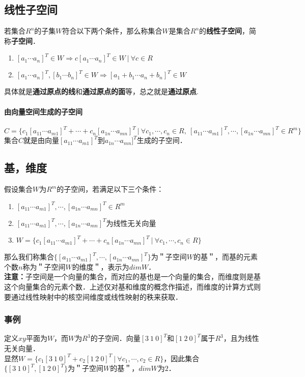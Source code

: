 \documentclass[12pt]{article}
\begin{document}
\begin{CJK}{UTF8}{gbsn}
\section{线性子空间}
若集合$R^n$的子集$W$符合以下两个条件，那么称集合$W$是集合$R^n$的\textbf{线性子空间}，简称\textbf{子空间}．
\begin{enumerate}
\item $[a_1\cdots a_n]^T\in W \Rightarrow c[a_1\cdots a_n]^T\in W\ |\ \forall c \in R$
\item $[a_1\cdots a_n]^T, [b_1\cdots b_n]^T\in W \Rightarrow [a_1+b_1\cdots a_n+b_n]^T\in W$
\end{enumerate}
具体就是\textbf{通过原点的线}和\textbf{通过原点的面}等，总之就是\textbf{通过原点}.
\paragraph{由向量空间生成的子空间}
\begin{equation}
C=\lbrace c_1[a_{11}\cdots a_{m1}]^T + \cdots + c_n[a_{1n}\cdots a_{mn}]^T\ |\ \forall c_1,\cdots,c_n \in R,\ [a_{11}\cdots a_{m1}]^T,\cdots,[a_{1n}\cdots a_{mn}]^T \in R^m\rbrace
\end{equation}
集合$C$就是由向量$[a_{11}\cdots a_{m1}]^T$到$a_{1n}\cdots a_{mn}]^T$生成的子空间．
\subsection{基，维度}
假设集合$W$为$R^m$的子空间，若满足以下三个条件：
\begin{enumerate}
\item $[a_{11} \cdots a_{m1}]^T, \cdots, [a_{1n} \cdots a_{mn}]^T \in R^m$
\item $[a_{11} \cdots a_{m1}]^T, \cdots, [a_{1n} \cdots a_{mn}]^T$为线性无关向量
\item $W=\lbrace c_1[a_{11} \cdots a_{m1}]^T + \cdots + c_n[a_{1n} \cdots a_{mn}]^T\ |\ \forall c_1,\cdots,c_n\in R \rbrace$
\end{enumerate}
那么我们称集合$\lbrace [a_{11} \cdots a_{m1}]^T, \cdots ,[a_{1n} \cdots a_{mn}]^T \rbrace$为＂子空间$W$的基＂，而基的元素个数$n$称为＂子空间$W$的维度＂，表示为$dimW$．\\
\textbf{注意：}子空间是一个向量的集合，而对应的基也是一个向量的集合，而维度则是基这个向量集合的元素个数．上述仅对基和维度的概念作描述，而维度的计算方式则要通过线性映射中的核空间维度或线性映射的秩来获取．
\subsubsection{事例}
定义$xy$平面为$W$，而$W$为$R^3$的子空间．向量$[3\ 1\ 0]^T$和$[1\ 2\ 0]^T$属于$R^3$，且为线性无关向量．\\显然$W=\lbrace c_1[3\ 1\ 0]^T  + c_2[1\ 2\ 0]^T\ |\ \forall c_1,\cdots,c_2\in R \rbrace$，因此集合$\lbrace [3\ 1\ 0]^T, [1\ 2\ 0]^T \rbrace$为＂子空间$W$的基＂，$dimW$为$2$．

\end{CJK}
\end{document}
